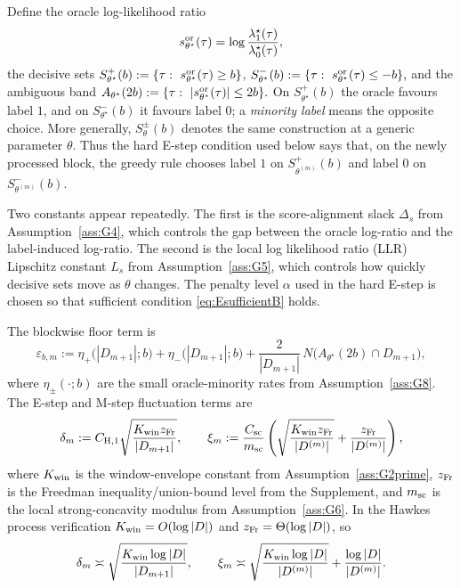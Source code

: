 \documentclass{statsoc}
\newcommand{\1}{\mathbbm{1}}
\begin{document}
Define the oracle log-likelihood ratio
\[
s^{\rm or}_{\theta^\star}(\tau)=\log\frac{\lambda_1^\star(\tau)}{\lambda_0^\star(\tau)},
\]
the decisive sets
\(
S_{\theta^\star}^+(b):=\{\tau:\ s^{\rm or}_{\theta^\star}(\tau)\ge b\}\),
\(
S_{\theta^\star}^-(b):=\{\tau:\ s^{\rm or}_{\theta^\star}(\tau)\le -b\},
\)
and the ambiguous band
\(
A_{\theta^\star}(2b):=\{\tau:\ |s^{\rm or}_{\theta^\star}(\tau)|\le 2b\}.
\)
On \(S_{\theta^\star}^+(b)\) the oracle favours label \(1\), and on \(S_{\theta^\star}^-(b)\) it favours label \(0\); a \emph{minority label} means the opposite choice. More generally, \(S_\theta^\pm(b)\) denotes the same construction at a generic parameter \(\theta\). Thus the hard E-step condition used below says that, on the newly processed block, the greedy rule chooses label \(1\) on \(S_{\theta^{(m)}}^+(b)\) and label \(0\) on \(S_{\theta^{(m)}}^-(b)\).

Two constants appear repeatedly. The first is the score-alignment slack \(\Delta_s\) from Assumption~\ref{ass:G4}, which controls the gap between the oracle log-ratio and the label-induced log-ratio. The second is the local log likelihood ratio (LLR) Lipschitz constant \(L_s\) from Assumption~\ref{ass:G5}, which controls how quickly decisive sets move as \(\theta\) changes. The penalty level \(\alpha\) used in the hard E-step is chosen so that sufficient condition \eqref{eq:EsufficientB} holds.

The blockwise floor term is
\[
\varepsilon_{b,m}
:=
\eta_+\bigl(|D_{m+1}|;b\bigr)
+
\eta_-\bigl(|D_{m+1}|;b\bigr)
+
\frac{2}{|D_{m+1}|}\,
N\!\big(A_{\theta^\star}(2b)\cap D_{m+1}\big),
\]
where \(\eta_\pm(\cdot;b)\) are the small oracle-minority rates from Assumption~\ref{ass:G8}. The E-step and M-step fluctuation terms are
\[
\delta_m
:=
C_{\rm H,1}\sqrt{\frac{K_{\rm win}z_{\rm Fr}}{|D_{m+1}|}},
\qquad
\xi_m
:=
\frac{C_{\rm sc}}{m_{\rm sc}}
\left(
\sqrt{\frac{K_{\rm win}z_{\rm Fr}}{|D^{(m)}|}}
+
\frac{z_{\rm Fr}}{|D^{(m)}|}
\right),
\]
where \(K_{\rm win}\) is the window-envelope constant from Assumption~\ref{ass:G2prime}, \(z_{\rm Fr}\) is the Freedman inequality/union-bound level from the Supplement, and \(m_{\rm sc}\) is the local strong-concavity modulus from Assumption~\ref{ass:G6}. In the Hawkes process verification \(K_{\rm win}=O(\log|D|)\) and \(z_{\rm Fr}=\Theta(\log|D|)\), so
\[
\delta_m\asymp \sqrt{\frac{K_{\rm win}\log |D|}{|D_{m+1}|}},
\qquad
\xi_m\asymp \sqrt{\frac{K_{\rm win}\log |D|}{|D^{(m)}|}}+\frac{\log|D|}{|D^{(m)}|}.
\]
\end{document}
